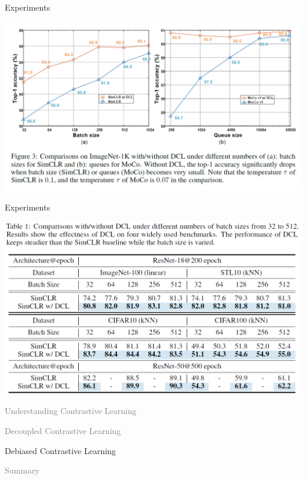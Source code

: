 \documentclass[aspectratio=169,mathserif]{beamer}  %
\newcommand{\light}[1]{\textcolor{gray}{#1}}
\begin{document}
\begin{frame}{Experiments}

\begin{center}
    \includegraphics[width=0.95\linewidth]{figure13.png}
\end{center}

\end{frame}



\begin{frame}{Experiments}

\begin{center}
    \includegraphics[width=0.9\linewidth]{figure14.png}
\end{center}

\end{frame}



\begin{frame}[noframenumbering]
\begin{itemize}
    \begin{LARGE}
    \item \light{Understanding Contrastive Learning}
    \item \light{Decoupled Contrastive Learning}
    \item Debiased Contrastive Learning
    \item \light{Summary}
    \end{LARGE}
\end{itemize}
\end{frame}
\end{document}
